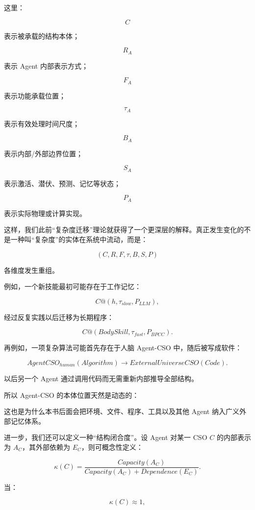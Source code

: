 这里：

\[
C
\]

表示被承载的结构本体；

\[
R_A
\]

表示 Agent 内部表示方式；

\[
F_A
\]

表示功能承载位置；

\[
\tau_A
\]

表示有效处理时间尺度；

\[
B_A
\]

表示内部/外部边界位置；

\[
S_A
\]

表示激活、潜伏、预测、记忆等状态；

\[
P_A
\]

表示实际物理或计算实现。

这样，我们此前“复杂度迁移”理论就获得了一个更深层的解释。真正发生变化的不是一种叫“复杂度”的实体在系统中流动，而是：

\[
\boxed{
(C,R,F,\tau,B,S,P)
}
\]

各维度发生重组。

例如，一个新技能最初可能存在于工作记忆：

\[
C
@
(h,\tau_{slow},P_{LLM}),
\]

经过反复实践以后迁移为长期程序：

\[
C
@
(BodySkill,\tau_{fast},P_{BPCC}).
\]

再例如，一项复杂算法可能首先存在于人脑 Agent-CSO 中，随后被写成软件：

\[
AgentCSO_{human}(Algorithm)
\rightarrow
ExternalUniverseCSO(Code).
\]

以后另一个 Agent 通过调用代码而无需重新内部推导全部结构。

所以 Agent-CSO 的本体位置天然是动态的：

\begin{statementbox}
\centering
{}
\end{statementbox}

这也是为什么本书后面会把环境、文件、程序、工具以及其他 Agent 纳入广义外部记忆体系。

进一步，我们还可以定义一种“结构闭合度”。设 Agent 对某一 CSO $C$ 的内部表示为 $A_C$，其外部依赖为 $E_C$，则可概念性定义：

\[
\kappa(C)
=
\frac{
Capacity(A_C)
}{
Capacity(A_C)+Dependence(E_C)
}.
\]

当：

\[
\kappa(C)\approx1,
\]

